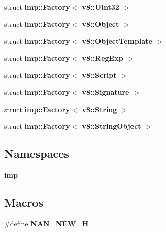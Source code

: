 \begin{DoxyCompactItemize}
struct \textbf{ imp\+::\+Factory$<$ v8\+::\+Uint32 $>$}
\item 
struct \textbf{ imp\+::\+Factory$<$ v8\+::\+Object $>$}
\item 
struct \textbf{ imp\+::\+Factory$<$ v8\+::\+Object\+Template $>$}
\item 
struct \textbf{ imp\+::\+Factory$<$ v8\+::\+Reg\+Exp $>$}
\item 
struct \textbf{ imp\+::\+Factory$<$ v8\+::\+Script $>$}
\item 
struct \textbf{ imp\+::\+Factory$<$ v8\+::\+Signature $>$}
\item 
struct \textbf{ imp\+::\+Factory$<$ v8\+::\+String $>$}
\item 
struct \textbf{ imp\+::\+Factory$<$ v8\+::\+String\+Object $>$}
\end{DoxyCompactItemize}
\subsection*{Namespaces}
\begin{DoxyCompactItemize}
\item 
 \textbf{ imp}
\end{DoxyCompactItemize}
\subsection*{Macros}
\begin{DoxyCompactItemize}
\item 
\#define \textbf{ N\+A\+N\+\_\+\+N\+E\+W\+\_\+\+H\+\_\+}
\end{DoxyCompactItemize}
